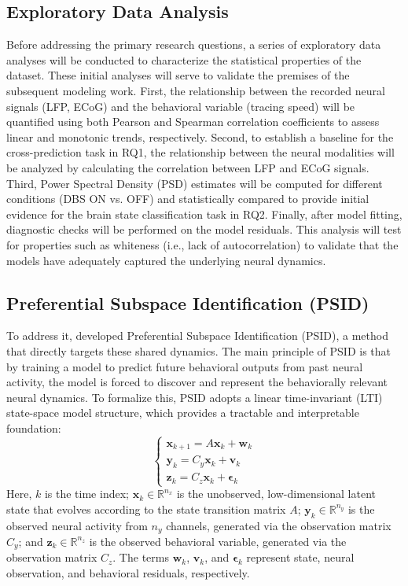 \documentclass[12pt, a4paper]{article}
\begin{document}
\subsection{Exploratory Data Analysis}
Before addressing the primary research questions, a series of exploratory data analyses will be conducted to characterize the statistical properties of the dataset. These initial analyses will serve to validate the premises of the subsequent modeling work. First, the relationship between the recorded neural signals (LFP, ECoG) and the behavioral variable (tracing speed) will be quantified using both Pearson and Spearman correlation coefficients to assess linear and monotonic trends, respectively. Second, to establish a baseline for the cross-prediction task in RQ1, the relationship between the neural modalities will be analyzed by calculating the correlation between LFP and ECoG signals. Third, Power Spectral Density (PSD) estimates will be computed for different conditions (DBS ON vs. OFF) and statistically compared to provide initial evidence for the brain state classification task in RQ2. Finally, after model fitting, diagnostic checks will be performed on the model residuals. This analysis will test for properties such as whiteness (i.e., lack of autocorrelation) to validate that the models have adequately captured the underlying neural dynamics.

\subsection{Preferential Subspace Identification (PSID)}
To address it, \textcite{saniModelingBehaviorallyRelevant2021} developed Preferential Subspace Identification (PSID), a method that directly targets these shared dynamics. The main principle of PSID is that by training a model to predict future behavioral outputs from past neural activity, the model is forced to discover and represent the behaviorally relevant neural dynamics. To formalize this, PSID adopts a linear time-invariant (LTI) state-space model structure, which provides a tractable and interpretable foundation:
\[
    \begin{cases}
        \mathbf{x}_{k+1} = A \mathbf{x}_k + \mathbf{w}_k \\
        \mathbf{y}_k = C_y \mathbf{x}_k + \mathbf{v}_k   \\
        \mathbf{z}_k = C_z \mathbf{x}_k + \boldsymbol{\epsilon}_k
    \end{cases}
\]
Here, $k$ is the time index; $\mathbf{x}_k \in \mathbb{R}^{n_x}$ is the unobserved, low-dimensional latent state that evolves according to the state transition matrix $A$; $\mathbf{y}_k \in \mathbb{R}^{n_y}$ is the observed neural activity from $n_y$ channels, generated via the observation matrix $C_y$; and $\mathbf{z}_k \in \mathbb{R}^{n_z}$ is the observed behavioral variable, generated via the observation matrix $C_z$. The terms $\mathbf{w}_k$, $\mathbf{v}_k$, and $\boldsymbol{\epsilon}_k$ represent state, neural observation, and behavioral residuals, respectively.
\end{document}
